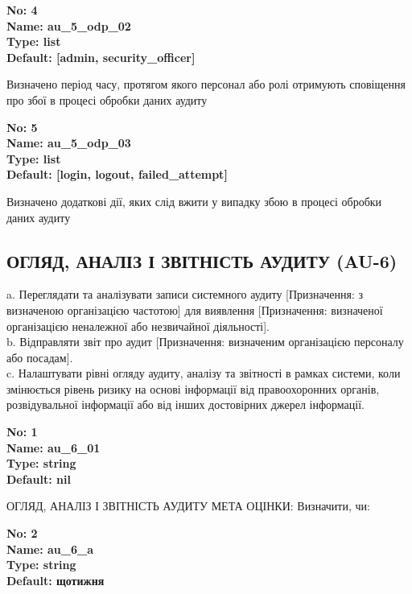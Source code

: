 \documentclass{article}
\begin{document}
{\footnotesize\bfseries
No: 4\\
Name: au\_\allowbreak{}5\_\allowbreak{}odp\_\allowbreak{}02\\
Type: list\\
Default: [\textquotedbl{}admin\textquotedbl{}, \textquotedbl{}security\_\allowbreak{}officer\textquotedbl{}]
}

{\footnotesize Визначено період часу, протягом якого персонал або ролі отримують сповіщення про збої в процесі обробки даних аудиту}


{\footnotesize\bfseries
No: 5\\
Name: au\_\allowbreak{}5\_\allowbreak{}odp\_\allowbreak{}03\\
Type: list\\
Default: [\textquotedbl{}login\textquotedbl{}, \textquotedbl{}logout\textquotedbl{}, \textquotedbl{}failed\_\allowbreak{}attempt\textquotedbl{}]
}

{\footnotesize Визначено додаткові дії, яких слід вжити у випадку збою в процесі обробки даних аудиту }




\subsection{ОГЛЯД, АНАЛІЗ І ЗВІТНІСТЬ АУДИТУ (AU-6)}
a. Переглядати та аналізувати записи системного аудиту [Призначення: з визначеною організацією частотою] для виявлення [Призначення: визначеної організацією неналежної або незвичайної діяльності].\\ 
b. Відправляти звіт про аудит [Призначення: визначеним організацією персоналу або посадам].\\ 
c. Налаштувати рівні огляду аудиту, аналізу та звітності в рамках системи, коли змінюється рівень ризику на основі інформації від правоохоронних органів, розвідувальної інформації або від інших достовірних джерел інформації.

\vspace{10pt}
{\footnotesize\bfseries
No: 1\\
Name: au\_\allowbreak{}6\_\allowbreak{}01\\
Type: string\\
Default: nil
}

{\footnotesize ОГЛЯД, АНАЛІЗ І ЗВІТНІСТЬ АУДИТУ МЕТА ОЦІНКИ: Визначити, чи:}


{\footnotesize\bfseries
No: 2\\
Name: au\_\allowbreak{}6\_\allowbreak{}a\\
Type: string\\
Default: \textquotedbl{}щотижня\textquotedbl{}
}
\end{document}
